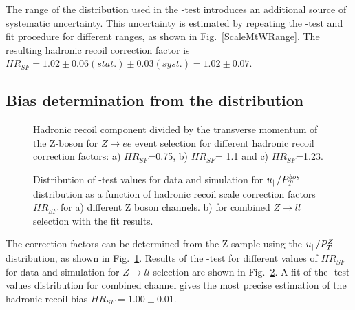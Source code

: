 The range of the \mtw distribution used in the \chiD-test introduces an additional source of systematic uncertainty. This uncertainty is estimated by repeating the \chiD-test and \chiD fit procedure for  different \mtw ranges, as shown in Fig.~\ref{ScaleMtWRange}. The resulting hadronic recoil correction factor is $HR_{SF}=1.02\pm0.06(stat.)\pm0.03(syst.)=1.02\pm0.07$. 


\subsection{Bias determination from the \upar distribution}




\begin{figure}[!tbp]
\endminipage\hfill
{}
\endminipage\hfill
{}%
\endminipage
\caption{Hadronic recoil component \upar divided by the transverse momentum of the Z-boson for $Z\to ee$ event selection for different hadronic recoil correction factors: a) $HR_{SF}$=0.75, b) $HR_{SF}$= 1.1 and c) $HR_{SF}$=1.23.}
\label{HadrRecoil:ZScan}
\end{figure}

\begin{figure}[!tbp]
\begin{minipage}[h]{0.49\linewidth}
\end{minipage}
\hfill
\begin{minipage}[h]{0.49\linewidth}
\end{minipage}
\caption{Distribution of \chiD-test values for  data and simulation for $u_{\parallel}/P_T^{bos}$ distribution as a function of hadronic recoil scale correction factors $HR_{SF}$ for a) different Z boson channels. 
b) for combined $Z \to ll$ selection with the \chiD fit results.}
\label{uPAr}
\end{figure}  
 
The correction factors can be determined from the Z sample using the $u_{\parallel}/P_T^{Z}$ distribution, as shown in Fig.~\ref{HadrRecoil:ZScan}. Results of the \chiD-test for different values of $HR_{SF}$ for data and simulation for $Z\to ll$ selection are shown in Fig.~\ref{uPAr}. A \chiD fit of the \chiD-test values distribution for combined channel  gives the most precise estimation of the hadronic recoil bias $HR_{SF} = 1.00 \pm 0.01$. 



